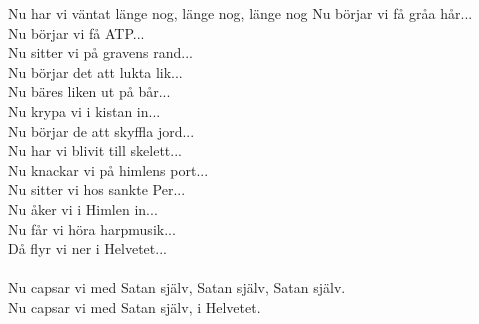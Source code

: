 \vspace{10pt}
\revrpt Nu har vi väntat länge nog, 
länge nog, länge nog \rpt
Nu börjar vi få gråa hår...\\
Nu börjar vi få ATP...\\
Nu sitter vi på gravens rand...\\
Nu börjar det att lukta lik...\\
Nu bäres liken ut på bår...\\
Nu krypa vi i kistan in...\\
Nu börjar de att skyffla jord...\\
Nu har vi blivit till skelett...\\
Nu knackar vi på himlens port...\\
Nu sitter vi hos sankte Per...\\
Nu åker vi i Himlen in...\\
Nu får vi höra harpmusik...\\
Då flyr vi ner i Helvetet...\\
\\
Nu capsar vi med Satan själv, Satan själv, Satan själv.\\
Nu capsar vi med Satan själv, i Helvetet.\\
